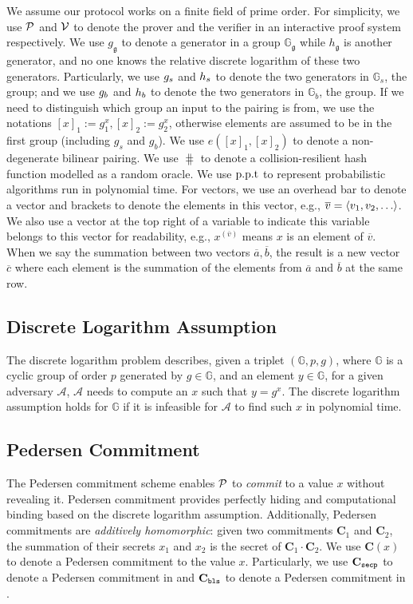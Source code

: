 We assume our protocol works on a finite field of prime order. For simplicity, we use $\mathcal{P}$ and $\mathcal{V}$ to denote the prover and the verifier in an interactive proof system respectively. We use $g_\mathfrak{g}$ to denote a generator in a group $\mathbb{G}_\mathfrak{g}$ while $h_\mathfrak{g}$ is another generator, and no one knows the relative discrete logarithm of these two generators. Particularly, we use $g_s$ and $h_s$ to denote the two generators in $\mathbb{G}_s$, the \secp group; and we use $g_b$ and $h_b$ to denote the two generators in $\mathbb{G}_b$, the \bls group. If we need to distinguish which group an input to the pairing is from, we use the notations $[x]_1:=g_1^x,[x]_2:=g_2^x$, otherwise elements are  assumed to be in the first group (including $g_s$ and $g_b$). We use $e([x]_1,[x]_2)$ to denote a non-degenerate bilinear pairing. We use $\hash$ to denote a collision-resilient hash function modelled as a random oracle. We use $\text{p.p.t}$ to represent probabilistic algorithms run in polynomial time.  For vectors, we use an overhead bar to denote a vector and brackets to denote the elements in this vector, e.g., $\overline{v}=\tuple{v_1,v_2,\dots}$. We also use a vector at the top right of a variable to indicate this variable belongs to this vector for readability, e.g., $x^{(\overline{v})}$ means $x$ is an element of $\overline{v}$. When we say the summation between two vectors $\overline{a},\overline{b}$, the result is a new vector $\overline{c}$ where each element is the summation of the elements from $\overline{a}$ and $\overline{b}$ at the same row.

\subsection{Discrete Logarithm Assumption}
\label{sec:dlp}
The discrete logarithm problem describes, given a triplet $(\mathbb{G}, p, g)$, where $\mathbb{G}$ is a cyclic group of order $p$ generated by $g\in\mathbb{G}$, and an element $y\in\mathbb{G}$, for a given adversary $\mathcal{A}$, $\mathcal{A}$ needs to compute an $x$ such that $y=g^x$. The discrete logarithm assumption holds for $\mathbb{G}$ if it is infeasible for $\mathcal{A}$ to find such $x$ in polynomial time.

\subsection{Pedersen Commitment}
\label{sec:pedersen}
The Pedersen commitment scheme \cite{pedersen} enables $\mathcal{P}$ to \textit{commit} to a value $x$ without revealing it. Pedersen commitment provides perfectly hiding and computational binding based on the discrete logarithm assumption. Additionally, Pedersen commitments are \textit{additively homomorphic}: given two commitments $\textbf{C}_1$ and $\textbf{C}_2$, the summation of their secrets $x_1$ and $x_2$ is the secret of $\textbf{C}_1\cdot\textbf{C}_2$. We use $\textbf{C}(x)$ to denote a Pedersen commitment to the value $x$. Particularly, we use $\textbf{C}_\texttt{secp}$ to denote a Pedersen commitment in \secp and $\textbf{C}_\texttt{bls}$ to denote a Pedersen commitment in \bls.

